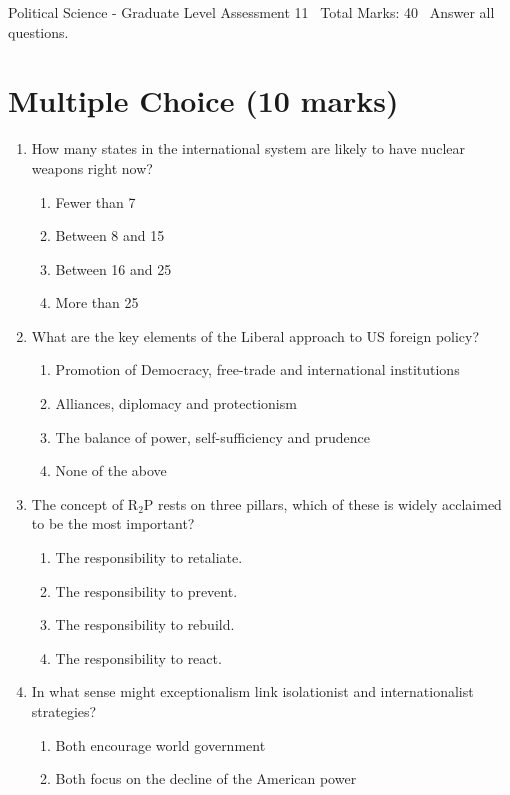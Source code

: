 \documentclass[12pt]{article}
\begin{document}
\begin{center}
Political Science - Graduate Level Assessment 11 \
Total Marks: 40 \
Answer all questions.
\end{center}

\section*{Multiple Choice (10 marks)}
\begin{enumerate}[label=\arabic*.]
\item How many states in the international system are likely to have nuclear weapons right now?
\begin{enumerate}[label=(\alph*)]
    \item Fewer than 7
    \item Between 8 and 15
    \item Between 16 and 25
    \item More than 25
\end{enumerate}
\item What are the key elements of the Liberal approach to US foreign policy?
\begin{enumerate}[label=(\alph*)]
    \item Promotion of Democracy, free-trade and international institutions
    \item Alliances, diplomacy and protectionism
    \item The balance of power, self-sufficiency and prudence
    \item None of the above
\end{enumerate}
\item The concept of R$_{2}$P rests on three pillars, which of these is widely acclaimed to be the most important?
\begin{enumerate}[label=(\alph*)]
    \item The responsibility to retaliate.
    \item The responsibility to prevent.
    \item The responsibility to rebuild.
    \item The responsibility to react.
\end{enumerate}
\item In what sense might exceptionalism link isolationist and internationalist strategies?
\begin{enumerate}[label=(\alph*)]
    \item Both encourage world government
    \item Both focus on the decline of the American power

\end{enumerate}
\end{enumerate}
\end{document}
